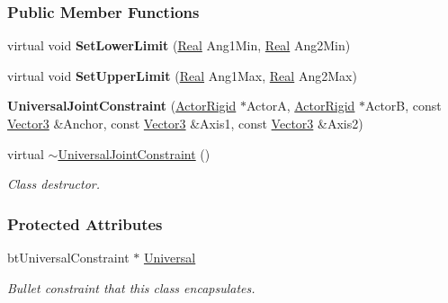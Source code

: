 \subsubsection*{Public Member Functions}
\begin{DoxyCompactItemize}
\item 
\hypertarget{classphys_1_1UniversalJointConstraint_a5ae59b4acac799fdae9253e21f13bc45}{
virtual void {\bfseries SetLowerLimit} (\hyperlink{namespacephys_af7eb897198d265b8e868f45240230d5f}{Real} Ang1Min, \hyperlink{namespacephys_af7eb897198d265b8e868f45240230d5f}{Real} Ang2Min)}
\label{classphys_1_1UniversalJointConstraint_a5ae59b4acac799fdae9253e21f13bc45}

\item 
\hypertarget{classphys_1_1UniversalJointConstraint_a1ed638fbb4c80d1b2556a6ba58b82583}{
virtual void {\bfseries SetUpperLimit} (\hyperlink{namespacephys_af7eb897198d265b8e868f45240230d5f}{Real} Ang1Max, \hyperlink{namespacephys_af7eb897198d265b8e868f45240230d5f}{Real} Ang2Max)}
\label{classphys_1_1UniversalJointConstraint_a1ed638fbb4c80d1b2556a6ba58b82583}

\item 
\hypertarget{classphys_1_1UniversalJointConstraint_a6b79aa65dd9d06825d696e219ea07aa0}{
{\bfseries UniversalJointConstraint} (\hyperlink{classphys_1_1ActorRigid}{ActorRigid} $\ast$ActorA, \hyperlink{classphys_1_1ActorRigid}{ActorRigid} $\ast$ActorB, const \hyperlink{classphys_1_1Vector3}{Vector3} \&Anchor, const \hyperlink{classphys_1_1Vector3}{Vector3} \&Axis1, const \hyperlink{classphys_1_1Vector3}{Vector3} \&Axis2)}
\label{classphys_1_1UniversalJointConstraint_a6b79aa65dd9d06825d696e219ea07aa0}

\item 
virtual \hyperlink{classphys_1_1UniversalJointConstraint_a7a3a84be61af8308091324bef1413acd}{$\sim$UniversalJointConstraint} ()
\begin{DoxyCompactList}\small\item\em Class destructor. \item\end{DoxyCompactList}\end{DoxyCompactItemize}
\subsubsection*{Protected Attributes}
\begin{DoxyCompactItemize}
\item 
\hypertarget{classphys_1_1UniversalJointConstraint_ab951b4d17ee706f81b8d63a4c60241ab}{
btUniversalConstraint $\ast$ \hyperlink{classphys_1_1UniversalJointConstraint_ab951b4d17ee706f81b8d63a4c60241ab}{Universal}}
\label{classphys_1_1UniversalJointConstraint_ab951b4d17ee706f81b8d63a4c60241ab}

\begin{DoxyCompactList}\small\item\em Bullet constraint that this class encapsulates. \item\end{DoxyCompactList}\end{DoxyCompactItemize}


